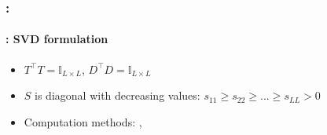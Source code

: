 \documentclass[xcolor=table]{beamer}
\begin{document}
\begin{frame}
	\frametitle{\insertshortsubtitle: \insertsection}
	\framesubtitle{\insertsubsection: SVD formulation}
	
	
	\begin{itemize}
		\item $T^\top T = \mathbb{I}_{L \times L}$, $D^\top D = \mathbb{I}_{L \times L}$
		\item $S$ is diagonal with decreasing values: $s_{11} \ge s_{22} \ge ... \ge s_{LL} > 0$
		\item Computation methods: , 
	\end{itemize}
	

\end{frame}
\end{document}

